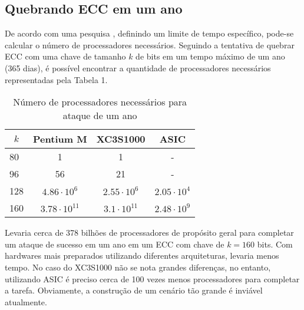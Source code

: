 %
%
\subsection{Quebrando ECC em um ano}
De acordo com uma pesquisa \cite{Pelzl:2006}, definindo um limite de tempo específico, pode-se calcular o número de processadores necessários. Seguindo a tentativa de quebrar ECC com uma chave de tamanho \(k\) de bits em um tempo máximo de um ano (365 dias), é possível encontrar a quantidade de processadores necessários representadas pela Tabela 1.

\begin{table}[]
\centering
\label{table:required_chips}
\begin{tabular}{|l|c|c|c|}
\hline
\multicolumn{1}{|c|}{\(k\)} & \textbf{Pentium M}   & \textbf{XC3S1000}   & \textbf{ASIC}     \\ \hline
80                      & 1                    & 1                   & -                 \\ \hline
96                      & 56                   & 21                  & -                 \\ \hline
128                     & $4.86 \cdot 10^6$    & $2.55 \cdot 10^6$   & $2.05 \cdot 10^4$ \\ \hline
160                     & $3.78 \cdot 10^{11}$ & $3.1 \cdot 10^{11}$ & $2.48 \cdot 10^9$ \\ \hline
\end{tabular}
\caption{Número de processadores necessários para ataque de um ano}
\end{table}

Levaria cerca de 378 bilhões de processadores de propósito geral para completar um ataque de sucesso em um ano em um ECC com chave de $k = 160$ bits. Com hardwares mais preparados utilizando diferentes arquiteturas, levaria menos tempo. No caso do XC3S1000 não se nota grandes diferenças, no entanto, utilizando ASIC é preciso cerca de 100 vezes menos processadores para completar a tarefa. Obviamente, a construção de um cenário tão grande é inviável atualmente.

